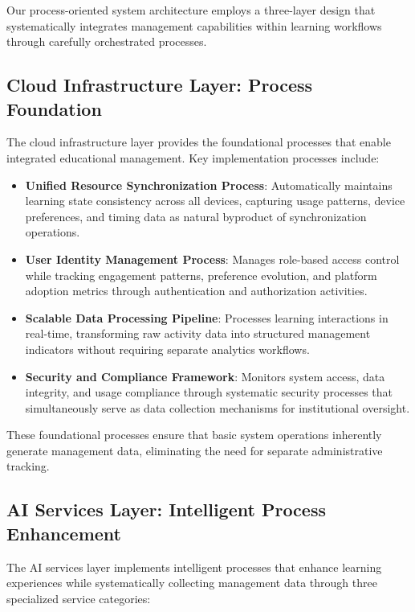 \documentclass[conference]{IEEEtran}
\begin{document}
Our process-oriented system architecture employs a three-layer design that systematically integrates management capabilities within learning workflows through carefully orchestrated processes.

\subsection{Cloud Infrastructure Layer: Process Foundation}

The cloud infrastructure layer provides the foundational processes that enable integrated educational management. Key implementation processes include:

\begin{itemize}
    \item \textbf{Unified Resource Synchronization Process}: Automatically maintains learning state consistency across all devices, capturing usage patterns, device preferences, and timing data as natural byproduct of synchronization operations.
    \item \textbf{User Identity Management Process}: Manages role-based access control while tracking engagement patterns, preference evolution, and platform adoption metrics through authentication and authorization activities.
    \item \textbf{Scalable Data Processing Pipeline}: Processes learning interactions in real-time, transforming raw activity data into structured management indicators without requiring separate analytics workflows.
    \item \textbf{Security and Compliance Framework}: Monitors system access, data integrity, and usage compliance through systematic security processes that simultaneously serve as data collection mechanisms for institutional oversight.
\end{itemize}

These foundational processes ensure that basic system operations inherently generate management data, eliminating the need for separate administrative tracking.

\subsection{AI Services Layer: Intelligent Process Enhancement}

The AI services layer implements intelligent processes that enhance learning experiences while systematically collecting management data through three specialized service categories:
\end{document}
